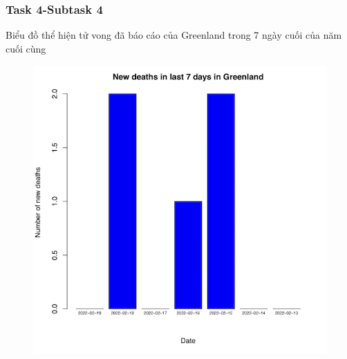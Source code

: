 \documentclass[english,10pt,table]{beamer}
\begin{document}
\frame
{
    \frametitle{Task 4-Subtask 4}
    \begin{block}{Biểu đồ thể hiện tử vong đã báo cáo của Greenland trong 7 ngày cuối của năm cuối cùng}
    \begin{figure}[H]
		\centering
		\includegraphics[scale=0.6]{images/4.3.3.png}
	\end{figure}
    \end{block}
}
\end{document}
